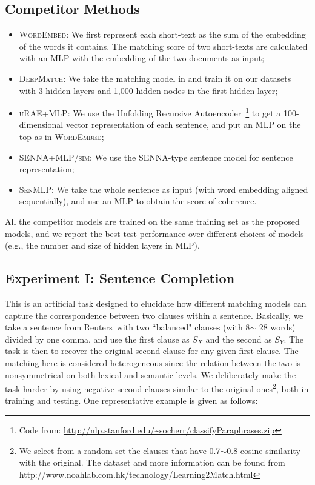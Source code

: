 \documentclass{article} %
\begin{document}
\subsection{Competitor Methods}
\begin{itemize}
\item \textsc{WordEmbed:} We first represent each short-text as the sum of the embedding of the words it contains. The matching score of two short-texts are calculated with an MLP with the embedding of the two documents as input; \vspace{-3pt}
\item \textsc{DeepMatch:} We take the matching model in \cite{nipsmatch} and train it on our datasets with 3 hidden layers and 1,000 hidden nodes in the first hidden layer; \vspace{-3pt}
\item \textsc{uRAE+MLP:} We use the Unfolding Recursive Autoencoder~\cite{socher2011}\footnote{Code from: \url{http://nlp.stanford.edu/~socherr/classifyParaphrases.zip}} to get a 100-dimensional vector representation of each sentence, and put an MLP on the top as in \textsc{WordEmbed}; \vspace{-3pt}
\item \textsc{SENNA+MLP/sim:} We use the SENNA-type sentence model for sentence representation;\vspace{-3pt}
\item \textsc{SenMLP:} We take the whole sentence as input (with word embedding aligned sequentially), and use an MLP to obtain the score of coherence. \vspace{-3pt}
\end{itemize}
All the competitor models are trained on the same training set as the proposed models, and we report the best test performance over different choices of models (e.g., the number and size of hidden layers in MLP).


\subsection{Experiment I: Sentence Completion} \label{s:expt1} \vspace{-10pt}
This is an artificial task designed to elucidate how different matching models can capture the correspondence between two clauses within a sentence.
Basically, we take a sentence from Reuters~\cite{rcv1}with two ``balanced" clauses (with 8$\sim$ 28 words) divided by one comma, and use the first clause as $S_X$ and the second as $S_Y$. The task is then to recover the original second clause for any given first clause. The matching here is considered  heterogeneous since the relation between the two is nonsymmetrical on both lexical and semantic levels.
We deliberately make the task harder by using negative second clauses similar to the original ones\footnote{We select from a random set the clauses that have 0.7$\sim$0.8 cosine similarity with the original. The dataset and more information can be found from http://www.noahlab.com.hk/technology/Learning2Match.html}, both in training and testing. One representative example is given as follows:
\end{document}
